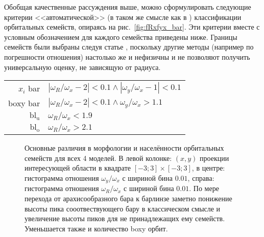 \documentclass[tikz]{trlnotes}
\begin{document}
Обобщая качественные рассуждения выше, можно сформулировать следующие критерии <<автоматической>> (в
таком же смысле как в \cite{valluri2016}) классификации орбитальных семейств, опираясь на
рис.~\ref{fig:fRxfyx_bar}. Эти критерии вместе с условным обозначением для каждого семейства приведены ниже.
Границы семейств были выбраны следуя статье \citet{portail2015}, поскольку другие методы (например по погрешности
отношения) настолько же и нефизичны и не позволяют получить универсальную оценку, не зависящую от радиуса.
\begin{table}[hb]
  \begin{tabular}{rl}
    $x_i$ bar & $|ω_R/ω_x - 2| < 0.1 \land |ω_y/ω_x - 1| < 0.1$ \\
    boxy bar  & $|ω_R/ω_x - 2| < 0.1 \land  ω_y/ω_x > 1.1$ \\
    $\text{bl}_\text{u}$  & $ω_R/ω_x < 1.9$ \\
    $\text{bl}_\text{o}$  & $ω_R/ω_x > 2.1$ \\
  \end{tabular}
\end{table}


\begin{figure}[htpb]
\centering
{}  
\caption{Основные различия в морфологии и населённости орбитальных семейств для всех 4 моделей. В левой колонке:
  $(x,y)$ проекции интересующей области в квадрате $[-3;3]\times[-3;3]$, в центре: гистограмма отношения $ω_y/ω_x$
  с шириной бина $0.01$, справа: гистограмма отношения $ω_R/ω_x$ с шириной бина $0.01$. По мере перехода от
  арахисообразного бара к барлинзе заметно понижение высоты пика сооотвествующего бару в классическом
  смысле и увеличение высоты пиков для не принадлежащих ему семейств. Уменьшается также и количество boxy орбит.
}
\label{fig:modelcomp1dist}
\end{figure}
\end{document}
